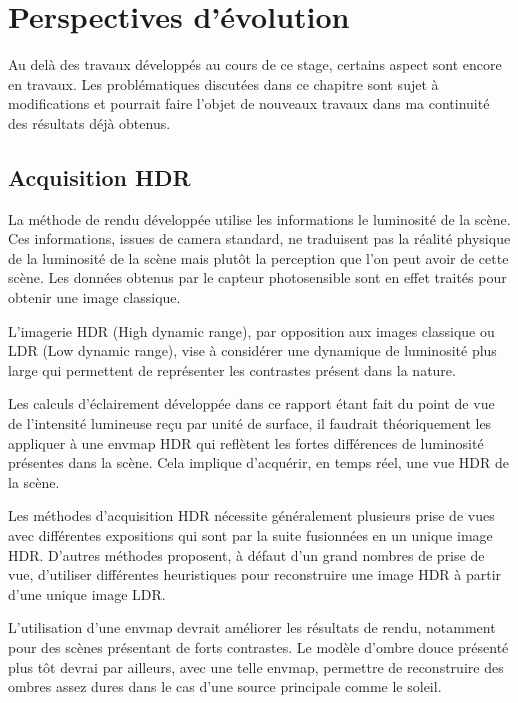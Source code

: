 \documentclass[10pt,a4paper,twoside, twocolumn]{report}
\begin{document}
\chapter{Perspectives d’évolution}

Au delà des travaux développés au cours de ce stage, certains aspect sont encore en travaux. Les problématiques discutées dans ce chapitre sont sujet à modifications et pourrait faire l’objet de nouveaux travaux dans ma continuité des résultats déjà obtenus.



\section{Acquisition HDR}

La méthode de rendu développée utilise les informations le luminosité de la scène. Ces informations, issues de camera standard, ne traduisent pas la réalité physique de la luminosité de la scène mais plutôt la perception que l’on peut avoir de cette scène. Les données obtenus par le capteur photosensible sont en effet traités pour obtenir une image classique.

L’imagerie HDR (High dynamic range), par opposition aux images classique ou LDR (Low dynamic range), vise à considérer une dynamique de luminosité plus large qui permettent de représenter les contrastes présent dans la nature. 

Les calculs d’éclairement développée dans ce rapport étant fait du point de vue de l’intensité lumineuse reçu par unité de surface, il faudrait théoriquement les appliquer à une envmap HDR qui reflètent les fortes différences de luminosité présentes dans la scène. Cela implique d’acquérir, en temps réel, une vue HDR de la scène. 

Les méthodes d’acquisition HDR nécessite généralement plusieurs prise de vues avec différentes expositions qui sont par la suite fusionnées en un unique image HDR. D’autres méthodes proposent, à défaut d’un grand nombres de prise de vue, d’utiliser différentes heuristiques pour reconstruire une image HDR à partir d’une unique image LDR\cite{Rempel2006}.

L’utilisation d’une envmap devrait améliorer les résultats de rendu, notamment pour des scènes présentant de forts contrastes. Le modèle d’ombre douce présenté plus tôt devrai par ailleurs, avec une telle envmap, permettre de reconstruire des ombres assez dures dans le cas d’une source principale comme le soleil.
\end{document}
